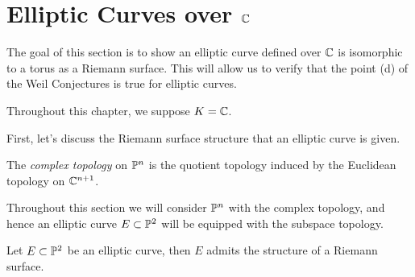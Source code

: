 \section{Elliptic Curves over \texorpdfstring{$\mathbb{C}$}{C}}
\label{sec:over-C}

The goal of this section is to show an elliptic curve defined over $\mathbb{C}$
is isomorphic to a torus as a Riemann surface. This will allow us to
verify that the point (d) of the Weil Conjectures is true for elliptic curves.

Throughout this chapter, we suppose $K = \mathbb{C}$.

First, let's discuss the Riemann surface structure that an elliptic curve 
is given.

\begin{definition}
	The \emph{complex topology} on $\mathbb{P}^n$ is the quotient topology induced
	by the Euclidean topology on $\mathbb{C}^{n+1}$.
\end{definition}

Throughout this section we will consider $\mathbb{P}^n$ with the complex topology,
and hence an elliptic curve $E \subset \mathbb{P}^2$ will be equipped with
the subspace topology.

\begin{proposition}
	\label{prop:riemann-surf-struct}
	Let $E \subset \mathbb{P}^2$ be an elliptic curve, then $E$ admits
	the structure of a Riemann surface.
\end{proposition}

